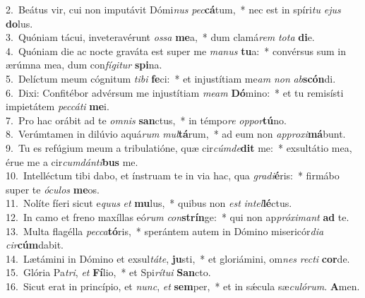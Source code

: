 {2.~}Beátus vir, cui non imputávit Dómi\textit{nus} \textit{pec}\textbf{cá}tum,~* nec est in spíri\textit{tu} \textit{e}\textit{jus} \textbf{do}lus.\\
{3.~}Quóniam tácui, inveteravérunt \textit{os}\textit{sa} \textbf{me}a,~* dum clamá\textit{rem} \textit{to}\textit{ta} \textbf{di}e.\\
{4.~}Quóniam die ac nocte graváta est super me \textit{ma}\textit{nus} \textbf{tu}a:~* convérsus sum in ærúmna mea, dum con\textit{fí}\textit{gi}\textit{tur} \textbf{spi}na.\\
{5.~}Delíctum meum cógnitum \textit{ti}\textit{bi} \textbf{fe}ci:~* et injustítiam me\textit{am} \textit{non} \textit{ab}\textbf{scón}di.\\
{6.~}Dixi: Confitébor advérsum me injustítiam \textit{me}\textit{am} \textbf{Dó}mino:~* et tu remisísti impietátem \textit{pec}\textit{cá}\textit{ti} \textbf{me}i.\\
{7.~}Pro hac orábit ad te \textit{om}\textit{nis} \textbf{san}ctus,~* in témpo\textit{re} \textit{op}\textit{por}\textbf{tú}no.\\
{8.~}Verúmtamen in dilúvio aquá\textit{rum} \textit{mul}\textbf{tá}rum,~* ad eum non \textit{ap}\textit{pro}\textit{xi}\textbf{má}bunt.\\
{9.~}Tu es refúgium meum a tribulatióne, quæ cir\textit{cúm}\textit{de}\textbf{dit} me:~* exsultátio mea, érue me a cir\textit{cum}\textit{dán}\textit{ti}\textbf{bus} me.\\
{10.~}Intelléctum tibi dabo, et ínstruam te in via hac, qua \textit{gra}\textit{di}\textbf{é}ris:~* firmábo super te \textit{ó}\textit{cu}\textit{los} \textbf{me}os.\\
{11.~}Nolíte fíeri sicut e\textit{quus} \textit{et} \textbf{mu}lus,~* quibus non \textit{est} \textit{in}\textit{tel}\textbf{lé}ctus.\\
{12.~}In camo et freno maxíllas eó\textit{rum} \textit{con}\textbf{strín}ge:~* qui non ap\textit{pró}\textit{xi}\textit{mant} \textbf{ad} te.\\
{13.~}Multa flagélla \textit{pec}\textit{ca}\textbf{tó}ris,~* sperántem autem in Dómino misericór\textit{di}\textit{a} \textit{cir}\textbf{cúm}dabit.\\
{14.~}Lætámini in Dómino et exsul\textit{tá}\textit{te}, \textbf{ju}sti,~* et gloriámini, om\textit{nes} \textit{re}\textit{cti} \textbf{cor}de.\\
{15.~}Glória Pa\textit{tri}, \textit{et} \textbf{Fí}lio,~* et Spi\textit{rí}\textit{tu}\textit{i} \textbf{San}cto.\\
{16.~}Sicut erat in princípio, et \textit{nunc}, \textit{et} \textbf{sem}per,~* et in sǽcula sæ\textit{cu}\textit{ló}\textit{rum}. \textbf{A}men.\\
